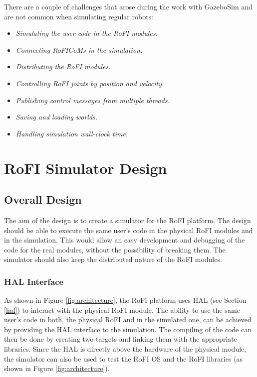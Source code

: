 \documentclass[
  printed, %
  color,   %
  notable, %
  oneside, %
  nolof,   %
  nolot,   %
  nocover,
]{fithesis3}
\begin{document}
There are a couple of challenges that arose during the work with GazeboSim and are not common when simulating regular robots:
\begin{itemize}
    \item \emph{Simulating the user code in the RoFI modules.}
    \item \emph{Connecting RoFICoMs in the simulation.}
    \item \emph{Distributing the RoFI modules.}
    \item \emph{Controlling RoFI joints by position and velocity.}
    \item \emph{Publishing control messages from multiple threads.}
    \item \emph{Saving and loading worlds.}
    \item \emph{Handling simulation wall-clock time.}
\end{itemize}


\chapter{RoFI Simulator Design}

\section{Overall Design}



The aim of the design is to create a simulator for the RoFI platform.
The design should be able to execute the same user's code in the physical RoFI modules and in the simulation.
This would allow an easy development and debugging of the code for the real modules, without the possibility of breaking them.
The simulator should also keep the distributed nature of the RoFI modules.

\subsection{HAL Interface}

As shown in Figure \ref{fig:architecture}, the RoFI platform uses HAL (see Section \ref{hal}) to interact with the physical RoFI module.
The ability to use the same user's code in both, the physical RoFI and in the simulated one, can be achieved by providing the HAL interface to the simulation.
The compiling of the code can then be done by creating two targets and linking them with the appropriate libraries.
Since the HAL is directly above the hardware of the physical module, the simulator can also be used to test the RoFI OS and the RoFI libraries (as shown in Figure \ref{fig:architecture}).
\end{document}
